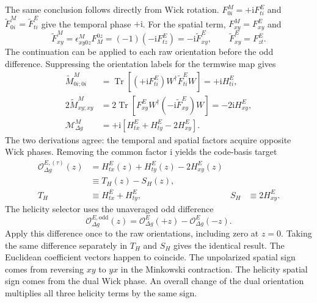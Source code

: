 \documentclass[11pt]{article}
\numberwithin{equation}{section}
\newcommand{\ii}{\mathrm{i}}
\newcommand{\cO}{\mathcal{O}}
\DeclareMathOperator{\Tr}{Tr}
\begin{document}
The same conclusion follows directly from Wick rotation.
\(F^M_{0i}=+\ii F^E_{ti}\) and
\(\widetilde F^M_{0i}=\widetilde F^E_{ti}\) give the temporal phase \(+\ii\).
For the spatial term, \(F^M_{xy}=F^E_{xy}\) and
\begin{equation}
 \widetilde F^M_{xy}
 =\epsilon^M_{xy0z}F_M^{0z}
 =(-1)(-\ii F^E_{tz})
 =-\ii \widetilde F^E_{xy},\qquad
 \widetilde F^E_{xy}=F^E_{zt}.
\end{equation}
The continuation can be applied to each raw orientation before the odd
difference.  Suppressing the orientation labels for the termwise map gives
\begin{align}
 \widetilde M^M_{0i;0i}
 &=\Tr\!\left[(+\ii F^E_{ti})W^\dagger
                  \widetilde F^E_{ti}W\right]
   =+\ii H^E_{ti},\\
 2\widetilde M^M_{xy;xy}
 &=2\Tr\!\left[F^E_{xy}W^\dagger
                 (-\ii\widetilde F^E_{xy})W\right]
   =-2\ii H^E_{xy},
 \label{eq:helicity-termwise-wick}\\
 \mathcal M_{\Delta g}^M
 &=+\ii\left[H^E_{tx}+H^E_{ty}-2H^E_{xy}\right].
 \label{eq:helicity-wick-result}
\end{align}
The two derivations agree: the temporal and spatial factors acquire opposite
Wick phases.  Removing the common factor \(\ii\) yields the code-basis target
\begin{align}
 \cO_{\Delta g}^{E,(\tau)}(z)
 &=H^E_{tx}(z)+H^E_{ty}(z)-2H^E_{xy}(z)\nonumber\\
 &\equiv T_H(z)-S_H(z),
 \label{eq:flowed-helicity-operator}\\
 T_H&\equiv H^E_{tx}+H^E_{ty},
 &S_H&\equiv2H^E_{xy}.
\end{align}
The helicity selector uses the unaveraged odd difference
\begin{equation}
 \cO_{\Delta g}^{E,\mathrm{odd}}(z)
 =\cO_{\Delta g}^{E}(+z)-\cO_{\Delta g}^{E}(-z).
 \label{eq:helicity-correct-odd-combination}
\end{equation}
Apply this difference once to the raw orientations, including zero at
\(z=0\).  Taking the same difference separately in \(T_H\) and \(S_H\)
gives the identical result.  The Euclidean coefficient vectors happen to
coincide.  The unpolarized spatial sign comes from reversing \(xy\) to \(yx\)
in the Minkowski contraction.  The helicity spatial sign comes from the
dual Wick phase.  An overall change of the dual orientation multiplies
all three helicity terms by the same sign.
\end{document}
